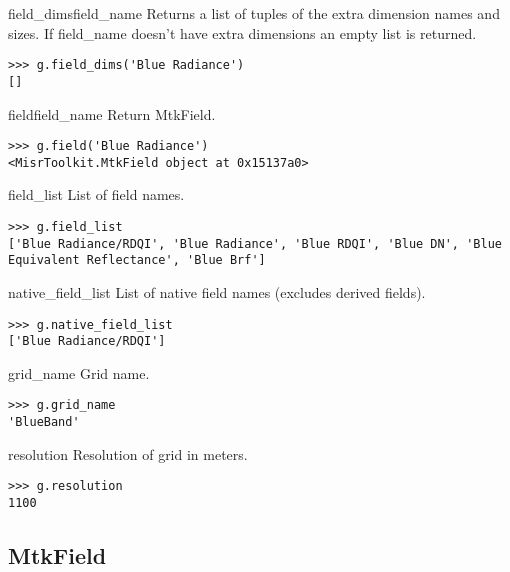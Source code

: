 \documentclass{howto}
\begin{document}
\begin{methoddesc}{field_dims}{field_name}
  Returns a list of tuples of the extra dimension names and sizes.  If field_name 
  doesn't have extra dimensions an empty list is returned.

\begin{verbatim}
>>> g.field_dims('Blue Radiance')
[]
\end{verbatim}
\end{methoddesc}

\begin{methoddesc}{field}{field_name}
  Return MtkField.

\begin{verbatim}
>>> g.field('Blue Radiance')
<MisrToolkit.MtkField object at 0x15137a0>
\end{verbatim}
\end{methoddesc}

\begin{memberdesc}[char]{field_list}
  List of field names.

\begin{verbatim}
>>> g.field_list
['Blue Radiance/RDQI', 'Blue Radiance', 'Blue RDQI', 'Blue DN', 'Blue Equivalent Reflectance', 'Blue Brf']
\end{verbatim}
\end{memberdesc}

\begin{memberdesc}[char]{native_field_list}
  List of native field names (excludes derived fields).

\begin{verbatim}
>>> g.native_field_list
['Blue Radiance/RDQI']
\end{verbatim}
\end{memberdesc}

\begin{memberdesc}[char]{grid_name}
  Grid name.

\begin{verbatim}
>>> g.grid_name
'BlueBand'
\end{verbatim}
\end{memberdesc}

\begin{memberdesc}[int]{resolution}
  Resolution of grid in meters.

\begin{verbatim}
>>> g.resolution
1100
\end{verbatim}
\end{memberdesc}


\subsection{MtkField \label{mtkfield}}
\end{document}
